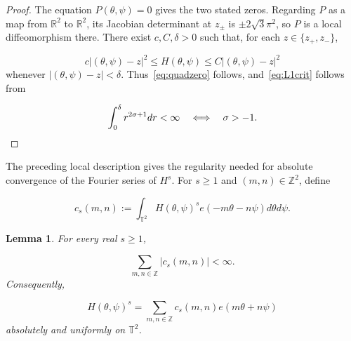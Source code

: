 \documentclass[11pt]{article}
\theoremstyle{plain}
\newtheorem{lemma}[theorem]{Lemma}
\theoremstyle{definition}
\theoremstyle{remark}
\begin{document}
\begin{proof}
The equation $P(\theta ,\psi ) = 0$ gives the two stated zeros. Regarding $P$ as a map from $\mathbb{R}^{2}$ to $\mathbb{R}^{2}$, its Jacobian determinant at $z_\pm$ is $\pm 2\sqrt{3}\pi^{2}$, so $P$ is a local diffeomorphism there. There exist $c, C, \delta > 0$ such that, for each $z \in \{z_{+}, z_{-}\}$,

\[
  c|(\theta ,\psi ) - z|^{2} \le H(\theta ,\psi ) \le C|(\theta ,\psi ) - z|^{2}
\]
whenever $|(\theta ,\psi ) - z| < \delta$. Thus~\eqref{eq:quadzero} follows, and~\eqref{eq:L1crit} follows from

\[
  \int_{0}^{\delta } r^{2\sigma +1} dr < \infty  \quad  \Longleftrightarrow \quad  \sigma > -1 . \qedhere
\]
\end{proof}

The preceding local description gives the regularity needed for absolute convergence of the Fourier series of $H^s$. For $s \ge 1$ and $(m,n) \in \mathbb{Z}^{2}$, define

\[
  c_s(m,n) := \int_{\mathbb{T}^{2}} H(\theta ,\psi )^s e(-m\theta - n\psi ) d\theta d\psi .
\]

\begin{lemma}\label{res:2.2}
For every real $s \ge 1$,

\[
  \sum_{m,n \in \mathbb{Z}} |c_s(m,n)| < \infty .
\]
Consequently,

\begin{equation}\label{eq:fourierH}
  H(\theta ,\psi )^s = \sum_{m,n \in \mathbb{Z}} c_s(m,n) e(m\theta + n\psi )
\end{equation}
absolutely and uniformly on $\mathbb{T}^{2}$.
\end{lemma}
\end{document}
